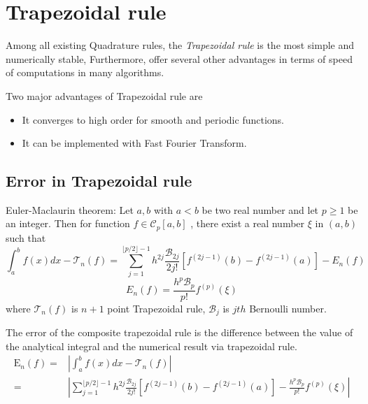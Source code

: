 \documentclass[../document.tex]{subfiles}
\begin{document}
	
	\chapter{Trapezoidal rule}
	Among all existing Quadrature rules, the \emph{Trapezoidal rule} is the most simple  and numerically stable,
	Furthermore, offer several other advantages in terms of speed of computations in many algorithms.
	
	Two major advantages of Trapezoidal rule are
	\begin{itemize}
		\item It converges to high order for smooth and periodic functions.
		\item It can be implemented with Fast Fourier Transform.
	\end{itemize}
	
	
	\section{Error in Trapezoidal rule}
	
	\begin{theorem}{Euler-Maclaurin theorem}:
		Let $a,b$ with $a<b$ be two real number and let $p\geq1$ be an integer. Then for function $f \in \mathcal{C}_p[a,b]$ ,
		there exist a real number $\xi$ in $(a,b)$ such that
		\begin{equation} \label{euler_macl}
			\int_a^b f(x)dx - \mathcal{T}_n(f) = 
			\sum_{j=1}^{ \lfloor p/2\rfloor -1 }  h^{2j} \frac{\mathcal{B}_{2j}}{2j!}
			\left[
			f^{(2j-1)}(b) - f^{(2j-1)}(a) 
			\right] -  E_n(f) 
		\end{equation}
		$$
		E_n(f) = \frac{h^p  \mathcal{B}_p  }{p!}  f^{ (p)} (\xi)
		$$
		where $\mathcal{T}_n(f)$ is $n+1$ point Trapezoidal rule, $\mathcal{B}_j$ is $jth$ Bernoulli number.
	\end{theorem}
	
	
	The error of the composite trapezoidal rule is the difference between the value of the analytical integral and the numerical result via trapezoidal rule.
	\begin{equation*}
		\begin{split}
			\mathrm{E}_n(f) =& \left| \int_a^b f(x)dx - \mathcal{T}_n (f) \right|
			\\
			=& \left| \sum_{j=1}^{ \lfloor p/2\rfloor -1 }  h^{2j} \frac{\mathcal{B}_{2j}}{2j!}
			\left[
			f^{(2j-1)}(b) - f^{(2j-1)}(a) 
			\right] -  \frac{h^p  \mathcal{B}_p  }{p!}  f^{ (p)} (\xi) \right| 
		\end{split}
	\end{equation*}
	
\end{document}
